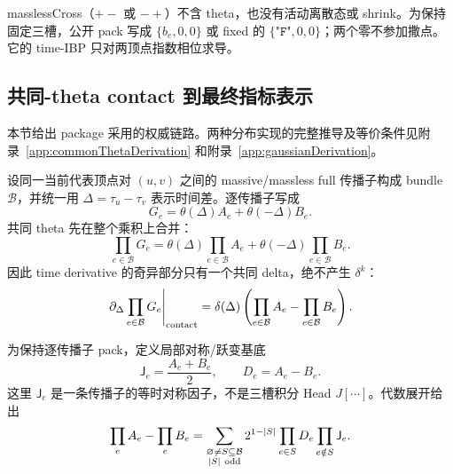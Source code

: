 ﻿\documentclass[a4paper,11pt]{article}
\begin{document}
masslessCross（$+-$ 或 $-+$）不含 theta，也没有活动离散态或 shrink。为保持固定三槽，公开 pack 写成 $\{b_e,0,0\}$ 或 fixed 的 $\{\texttt{"F"},0,0\}$；两个零不参加撒点。它的 time-IBP 只对两顶点指数相位求导。

\subsection{共同-theta contact 到最终指标表示}

本节给出 package 采用的权威链路。两种分布实现的完整推导及等价条件见附录~\ref{app:commonThetaDerivation} 和附录~\ref{app:gaussianDerivation}。

设同一当前代表顶点对 $(u,v)$ 之间的 massive/massless full 传播子构成 bundle $\mathcal B$，并统一用 $\Delta=\tau_u-\tau_v$ 表示时间差。逐传播子写成
\begin{equation}
 G_e=\theta(\Delta)A_e+\theta(-\Delta)B_e.
 \label{bundleSingleLine}
\end{equation}
共同 theta 先在整个乘积上合并：
\begin{equation}
 \prod_{e\in\mathcal B}G_e
 =\theta(\Delta)\prod_{e\in\mathcal B}A_e
 +\theta(-\Delta)\prod_{e\in\mathcal B}B_e.
 \label{bundleCommonThetaProduct}
\end{equation}
因此 time derivative 的奇异部分只有一个共同 delta，绝不产生 $\delta^k$：
\begin{equation}
 \left.\partial_\Delta\prod_{e\in\mathcal B}G_e\right|_{\rm contact}
 =\delta(\Delta)
 \left(\prod_{e\in\mathcal B}A_e-\prod_{e\in\mathcal B}B_e\right).
 \label{bundleUniqueBoundary}
\end{equation}

为保持逐传播子 pack，定义局部对称/跃变基底
\begin{equation}
 \mathsf J_e=\frac{A_e+B_e}{2},\qquad D_e=A_e-B_e.
 \label{bundleJDDefinition}
\end{equation}
这里 $\mathsf J_e$ 是一条传播子的等时对称因子，不是三槽积分 Head $J[\cdots]$。代数展开给出
\begin{equation}
 \prod_eA_e-\prod_eB_e
 =\sum_{\substack{\varnothing\ne S\subseteq\mathcal B\\ |S|\ {\rm odd}}}
 2^{1-|S|}\prod_{e\in S}D_e\prod_{e\notin S}\mathsf J_e.
 \label{commonThetaOddSubset}
\end{equation}
\end{document}
